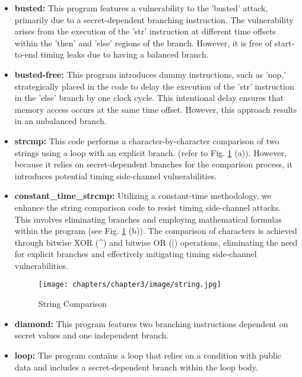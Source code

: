\begin{itemize}
    \item \textbf{busted:} This program features a vulnerability to the 'busted' attack, primarily due to a secret-dependent branching instruction. The vulnerability arises from the execution of the 'str' instruction at different time offsets within the 'then' and 'else' regions of the branch. However, it is free of start-to-end timing leaks due to having a balanced branch.

    \item \textbf{busted-free:} This program introduces dummy instructions, such as 'nop,' strategically placed in the code to delay the execution of the 'str' instruction in the 'else' branch by one clock cycle. This intentional delay ensures that memory access occurs at the same time offset. However, this approach results in an unbalanced branch.

    \item \textbf{strcmp:} This code performs a character-by-character comparison of two strings using a loop with an explicit branch. (refer to Fig. \ref{fig:string} (a)). However, because it relies on secret-dependent branches for the comparison process, it introduces potential timing side-channel vulnerabilities.

    \item \textbf{ constant\_time\_strcmp:} Utilizing a constant-time methodology, we enhance the string comparison code to resist timing side-channel attacks. This involves eliminating branches and employing mathematical formulas within the program (see Fig. \ref{fig:string} (b)). The comparison of characters is achieved through bitwise XOR (\textasciicircum) and bitwise OR ($|$) operations, eliminating the need for explicit branches and effectively mitigating timing side-channel vulnerabilities.

 \begin{figure}
  \centering
  \medskip
  \texttt{[image: chapters/chapter3/image/string.jpg]}
  \caption[Short caption for Table of Figures]{String Comparison}
  \label{fig:string}
\end{figure}

    \item \textbf{diamond:} This program features two branching instructions dependent on secret values and one independent branch.

    \item \textbf{loop:} The program contains a loop that relies on a condition with public data and includes a secret-dependent branch within the loop body. 
    

\end{itemize}
